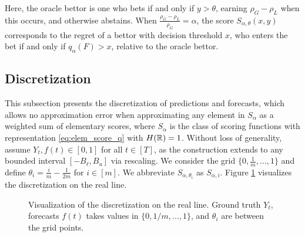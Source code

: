 Here, the oracle bettor is one who bets if and only if $y > \theta$, earning $\rho_G - \rho_L$ when this occurs, and otherwise abstains. When $\frac{\rho_G-\rho_L}{\rho_G} = \alpha$, the score $S_{\alpha, \theta}(x,y)$ corresponds to the regret of a bettor with decision threshold $x$, who enters the bet if and only if $q_\alpha(F) > x$, relative to the oracle bettor.







\subsection{Discretization} \label{subsec:discretization}
This subsection presents the discretization of predictions and forecasts, which allows no approximation error when approximating any element in $S_\alpha$ as a weighted sum of elementary scores, where $S_\alpha$ is the class of scoring functions with representation \eqref{eq:elem_score_q} with $H(\mathbb{R})=1$. Without loss of generality, assume $Y_t, f(t) \in [0,1]$ for all $t \in [T]$, as the construction extends to any bounded interval $[-B_\ell, B_u]$ via rescaling. We consider the grid $\{0, \frac{1}{m}, \ldots, 1\}$ and define $\theta_i = \frac{i}{m} - \frac{1}{2m}$ for $i \in [m]$. We abbreviate $S_{\alpha, \theta_i}$ as $S_{\alpha, i}$. Figure \ref{fig:discretization} visualizes the discretization on the real line.


\begin{figure}[h]
\centering
{}
\caption{Visualization of the discretization on the real line. Ground truth $Y_t$, forecasts $f(t)$ takes values in $\{0, 1/m, ..., 1\}$, and $\theta_i$ are between the grid points.} \label{fig:discretization}
\end{figure}

